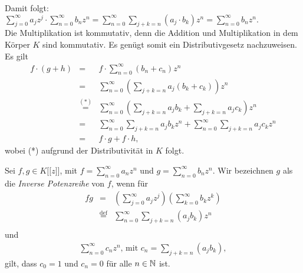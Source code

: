 {Damit folgt: $ \sum_{j=0}^\infty a_jz^j \cdot \sum_{n=0}^\infty b_nz^n = \sum_{n=0}^\infty \sum_{j+k=n} \left(a_j\cdot b_k\right)z^n = \sum_{n=0}^\infty b_nz^n. $\\ 
Die Multiplikation ist kommutativ, denn die Addition und Multiplikation in dem Körper $K$ sind kommutativ. Es genügt somit ein Distributivgesetz nachzuweisen. Es gilt
\begin{eqnarray*}
f\cdot \left(g + h\right) &=& f \cdot \sum_{n=0}^\infty \left(b_n + c_n\right) z^n\\
&=& \sum_{n=0}^\infty \left(\sum_{j+k=n} a_j \left(b_k +c_k\right)\right) z^n\\
&\stackrel{\mathrm{(*)}}=& \sum_{n=0}^\infty \left(\sum_{j+k=n} a_j b_k +\sum_{j+k=n} a_j c_k\right) z^n\\
&=& \sum_{n=0}^\infty \sum_{j+k=n} a_j b_k z^n +\sum_{n=0}^\infty \sum_{j+k=n} a_j c_k z^n\\
&=& f\cdot g + f\cdot h,
\end{eqnarray*}
wobei (*) aufgrund der Distributivität in $K$ folgt.\\
 }
%
%
%
%
%
%
\begin{satz} 
Sei $f, g \in K\lbrack\lbrack z\rbrack\rbrack$, mit $f = \sum_{n=0}^\infty a_n z^n$ und $g = \sum_{n=0}^\infty b_n z^n$. Wir bezeichnen $g$ als die \textit{Inverse Potenzreihe} von $f$, wenn für
\begin{eqnarray*}
fg &=& \left( \sum_{j=0}^\infty a_j z^j \right) \left( \sum_{k=0}^\infty b_k z^k \right)\\  
&\stackrel{\mathrm{def}}=& \sum_{n=0}^\infty\sum_{j+k=n} (a_j b_k) z^n\\ 
\end{eqnarray*}
%
und 
\begin{eqnarray*}
\sum_{n= 0}^{\infty} c_nz^n \text{, mit } c_n = \sum_{j+k=n} (a_j b_k),
\end{eqnarray*}
gilt, dass $c_0 =1$ und $c_n = 0$ für alle $n\in\mathbb{N}$ ist.
\end{satz}
